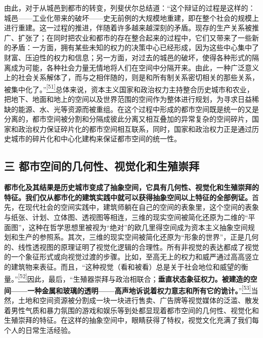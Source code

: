 \documentclass[UTF8, fontset = sourcesans, a4paper, oneside, zihao =
-4, scheme=chinese, no-math, space=true]{ctexbook}
\begin{document}
由此，对于从城邑到都市的转变，列斐伏尔总结道：``这个辩证的过程是这样的：城邑------工业化带来的破坏------史无前例的大规模地重建，即在整个社会的规模上进行重建。这一过程的推进，伴随着许多越来越深刻的矛盾。现存的生产关系被推广、扩张了；在同时把农业和都市的存在整合起来的过程中，它们又带来了一些新的矛盾：一方面，拥有某些未知的权力的决策中心已经形成，因为这些中心集中了财富、压迫性的权力和信息；另一方面，对过去的城邑的破坏，使得各种形式的隔离成为可能，各种社会力量无情地将人们在空间中分隔开来。由此，一种广泛意义上的社会关系解体了，而与之相伴随的，则是和所有制关系密切相关的那些关系，被集中化了。''\protect\hypertarget{part0007_split_003.htmlux5cux23w51}{}{}\protect\hyperlink{part0007_split_004.htmlux5cux23m51}{\textsuperscript{{[}51{]}}}总体来说，资本主义国家和政治权力主持整合历史城市和农业，把地下、地面和地上的空间以及世界范围的空间作为整体进行规划，为寻求日益稀缺的能源、水、光等资源而被重组。在这个过程中形成的都市空间既是统一的又是分离的，都市空间被分割和分隔成彼此分离又相互叠加的异常复杂的空间碎片，国家和政治权力保证碎片化的都市空间相互联系，同时，国家和政治权力正是通过历史城市的碎片化和中心化建构来保证都市空间的统一性。

\subsection{三
都市空间的几何性、视觉化和生殖崇拜}\label{part0007_split_003.htmlux5cux23c032}

\textbf{都市化及其结果是历史城市变成了抽象空间，它具有几何性、视觉化和生殖崇拜的特征。我们仅从都市化的建筑实践中就可以获得抽象空间以上特征的全部例证。}首先，在现代社会的空间实践中，建筑师躺在自己的空间的表象里，这个空间的表象与纸张、计划、立体图、透视图等相连，三维的现实空间被简化还原为二维的``平面图''，这种在哲学思想里被视为``绝对''的欧几里得空间成为资本主义抽象空间规划和生产的参照系。其次，三维的现实空间被简化还原为``形象的世界''，正是几何的、线性透视图的原理证明了视觉化逻辑的合理性。所有非视觉的表达都成了视觉的一个象征形式或向视觉过渡的步骤。比如，至高无上的权力和威严通过高高竖立的建筑物来表征。而且，``这种视觉（看和被看）总是关于社会地位和威望的衡量。''\protect\hypertarget{part0007_split_003.htmlux5cux23w52}{}{}\protect\hyperlink{part0007_split_004.htmlux5cux23m52}{\textsuperscript{{[}52{]}}}因此，最后，``生殖器崇拜与政治相联合；\textbf{垂直状态象征权力。被建造的空间------一种金属和玻璃的透明------高声地诉说着权力意志和所有它的诡计。}''\protect\hypertarget{part0007_split_003.htmlux5cux23w53}{}{}\protect\hyperlink{part0007_split_004.htmlux5cux23m53}{\textsuperscript{{[}53{]}}}当然，土地和空间资源被分割成一块一块进行售卖、广告牌等视觉媒体的泛滥、散发着男性气质和暴力氛围的游戏和娱乐等到处都显现着都市空间的几何性、视觉化和生殖崇拜的特征。在这样的抽象空间中，眼睛获得了特权，视觉文化充满了我们每个人的日常生活经验。
\end{document}
